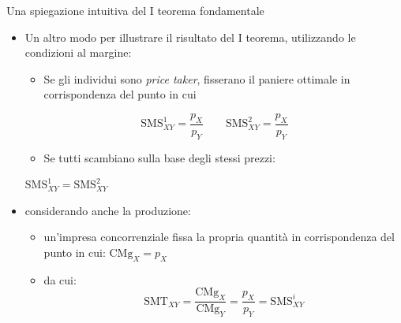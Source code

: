 \documentclass[aspectratio=149,11pt]{beamer}
\begin{document}
\begin{frame}{Una spiegazione intuitiva del I teorema fondamentale}
\begin{itemize}
\item Un altro modo per illustrare il risultato del I teorema, utilizzando le condizioni al margine:
\begin{itemize}
\item Se gli individui sono \emph{price taker}, fisserano il paniere ottimale in corrispondenza del punto in cui
\end{itemize}
\begin{equation*}
\text{SMS}^1_{XY}=\frac{p_X}{p_Y} \qquad \text{SMS}^2_{XY}=\frac{p_X}{p_Y}
\end{equation*}
\begin{itemize}
\item Se tutti scambiano sulla base degli stessi prezzi:
\end{itemize}
$\text{SMS}^1_{XY} = \text{SMS}^2_{XY}$
\item considerando anche la produzione:
\begin{itemize}
\item un’impresa concorrenziale fissa la propria quantità in corrispondenza del punto in cui:   $\text{CMg}_X=p_X$
\item da cui: $$\text{SMT}_{XY}=\frac{\text{CMg}_X}{\text{CMg}_Y}=\frac{p_X}{p_Y} = \text{SMS}^i_{XY}$$
\end{itemize}
\end{itemize}
\end{frame}
\end{document}
